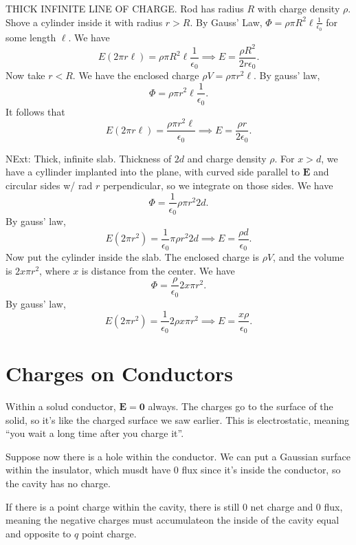 THICK INFINITE LINE OF CHARGE. Rod has radius $R$ with charge density $\rho$. Shove a cylinder inside it with radius $r>R$. By Gauss' Law, $\Phi =\rho \pi R^2\ell \frac{1}{\epsilon _0} $ for some length $\ell $. We have
 \[
	E(2\pi r \ell )=\rho \pi R^2 \ell  \frac{1}{\epsilon _0}\implies E=\frac{\rho R^2}{2r\epsilon _0}
.\]
Now take $r<R$. We have the enclosed charge $\rho V=\rho \pi r^2 \ell $. By gauss' law,
\[
	\Phi =\rho \pi r^2 \ell \frac{1}{\epsilon _0}
.\]
It follows that
\[
	E(2\pi r \ell )=\frac{\rho \pi r^2 \ell }{\epsilon _0}\implies E= \frac{\rho r}{2\epsilon _0}
.\]

NExt: Thick, infinite slab. Thickness of $2d$ and charge density $\rho $. For $x>d$, we have a cyllinder implanted into the plane, with curved side parallel to $\mathbf{E}$ and circular sides w/ rad $r$ perpendicular, so we integrate on those sides. We have
\[
	\Phi =\frac{1}{\epsilon _0}\rho \pi r^2 2d
.\]
By gauss' law,
\[
	E(2\pi r^2)=\frac{1}{\epsilon _0}\pi \rho r^2 2d \implies E=\frac{\rho d}{\epsilon _0}
.\]
Now put the cylinder inside the slab. The enclosed charge is $\rho V$, and the volume is $2x \pi r^2$, where $x$ is distance from the center. We have
\[
	\Phi =\frac{\rho }{\epsilon _0} 2x\pi r^2
.\]
By gauss' law,
\[
	E(2\pi r^2)=\frac{1}{\epsilon _0}2\rho x\pi r^2 \implies E=\frac{x\rho }{\epsilon _0}
.\]
\section{Charges on Conductors}
Within a solud conductor, $\mathbf{E}=\mathbf{0}$ always. The charges go to the surface of the solid, so it's like the charged surface we saw earlier. This is electrostatic, meaning ``you wait a long time after you charge it''.

Suppose now there is a hole within the conductor. We can put a Gaussian surface within the insulator, which musdt have 0 flux since it's inside the conductor, so the cavity has no charge.

If there is a point charge within the cavity, there is still 0 net charge and 0 flux, meaning the negative charges must accumulateon the inside of the cavity equal and opposite to $q$ point charge.

